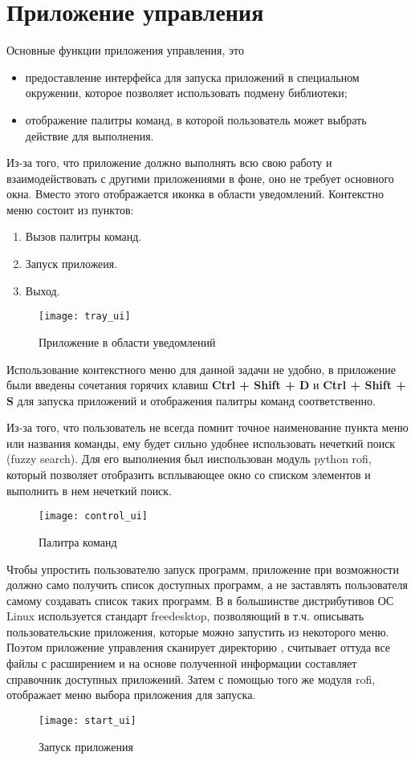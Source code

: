 \section{Приложение управления}

Основные функции приложения управления, это
\begin{itemize}
    \item предоставление интерфейса для запуска приложений в специальном
    окружении, которое позволяет использовать подмену библиотеки;
    \item отображение палитры команд, в которой пользователь может выбрать
    действие для выполнения.
\end{itemize}

Из-за того, что приложение должно выполнять всю свою работу и взаимодействовать
с другими приложениями в фоне, оно не требует основного окна. Вместо этого
отображается иконка в области уведомлений. Контекстно меню состоит из пунктов:

\begin{enumerate}
    \item Вызов палитры команд.
    \item Запуск приложеия.
    \item Выход.
\end{enumerate}

\begin{figure}[h]
    \centering
    \texttt{[image: tray\_ui]}
    \caption{Приложение в области уведомлений}
\end{figure}

Использование контекстного меню для данной задачи не удобно, в приложение
были введены сочетания горячих клавиш \textbf{Ctrl + Shift + D} и
\textbf{Ctrl + Shift + S} для запуска приложений и отображения палитры команд
соответственно.

Из-за того, что пользователь не всегда помнит точное наименование пункта меню
или названия команды, ему будет сильно удобнее использовать нечеткий поиск
(fuzzy search). Для его выполнения был ииспользован модуль python rofi, который
позволяет отобразить всплывающее окно со списком элементов и выполнить в нем
нечеткий поиск.

\begin{figure}[h]
    \centering
    \texttt{[image: control\_ui]}
    \caption{Палитра команд}
\end{figure}

Чтобы упростить пользователю запуск программ, приложение при возможности должно
само получить список доступных программ, а не заставлять пользователя самому
создавать список таких программ. В в большинстве дистрибутивов ОС Linux
используется стандарт freedesktop, позволяющий в т.ч. описывать пользовательские
приложения, которые можно запустить из некоторого меню. Поэтом приложение
управления сканирует директорию , считывает оттуда
все файлы с расширением  и на основе полученной информации
составляет справочник доступных приложений. Затем с помощью того же модуля rofi,
отображает меню выбора приложения для запуска.

\begin{figure}[h]
    \centering
    \texttt{[image: start\_ui]}
    \caption{Запуск приложения}
\end{figure}
